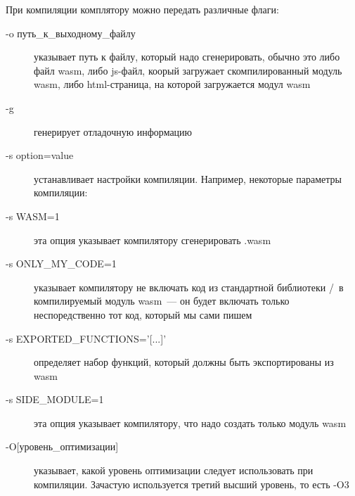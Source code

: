 При компиляции комплятору можно передать различные флаги:
\begin{description}

\item[-o путь\_к\_выходному\_файлу] указывает путь к файлу, который надо
сгенерировать, обычно это либо файл wasm, либо js-файл, коорый загружает
скомпилированный модуль wasm, либо html-страница, на которой загружается модул
wasm

\item[-g] генерирует отладочную информацию

\item[-s option=value] устанавливает настройки компиляции. Например, некоторые
параметры компиляции:

\item[-s WASM=1] эта опция указывает компилятору сгенерировать .wasm

\item[-s ONLY\_MY\_CODE=1] указывает компилятору не включать код из стандартной
библиотеки \emc/\cpp\ в компилируемый модуль wasm\ --- он будет включать только
неспоредственно тот код, который мы сами пишем

\item[-s EXPORTED\_FUNCTIONS='{[}...{]}'] определяет набор функций, который
должны быть экспортированы из wasm

\item[-s SIDE\_MODULE=1] эта опция указывает компилятору, что надо создать
только модуль wasm

\item[-O{[}уровень\_оптимизации{]}] указывает, какой уровень оптимизации следует
использовать при компиляции. Зачастую используется третий высший уровень, то
есть -O3

\end{description}

\secup
